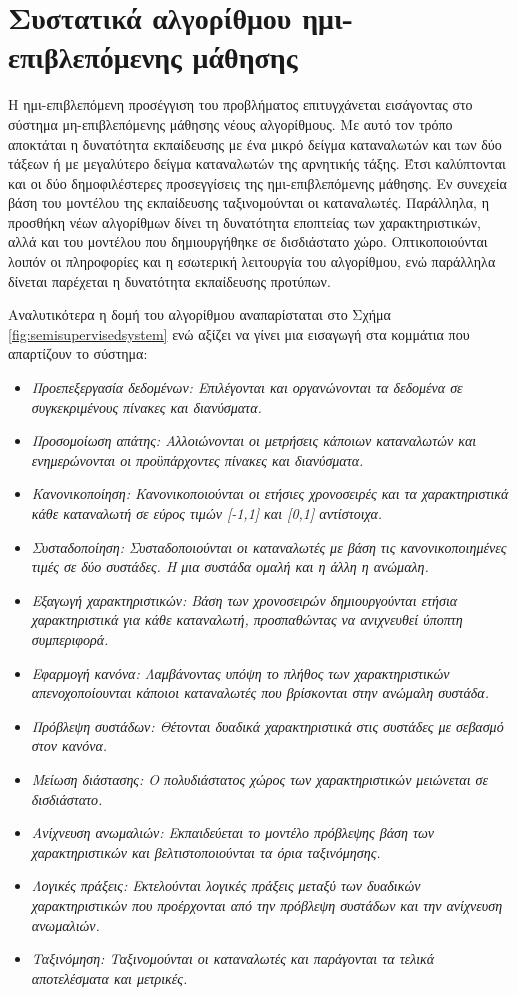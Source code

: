 \section{Συστατικά αλγορίθμου ημι-επιβλεπόμενης μάθησης}
Η ημι-επιβλεπόμενη προσέγγιση του προβλήματος επιτυγχάνεται εισάγοντας στο σύστημα μη-επιβλεπόμενης μάθησης νέους αλγορίθμους. Με αυτό τον τρόπο αποκτάται η δυνατότητα εκπαίδευσης με ένα μικρό δείγμα καταναλωτών και των δύο τάξεων ή με μεγαλύτερο δείγμα καταναλωτών της αρνητικής τάξης. Έτσι καλύπτονται και οι δύο δημοφιλέστερες προσεγγίσεις της ημι-επιβλεπόμενης μάθησης. Εν συνεχεία βάση του μοντέλου της εκπαίδευσης ταξινομούνται οι καταναλωτές. Παράλληλα, η προσθήκη νέων αλγορίθμων δίνει τη δυνατότητα εποπτείας των χαρακτηριστικών, αλλά και του μοντέλου που δημιουργήθηκε σε δισδιάστατο χώρο. Οπτικοποιούνται λοιπόν οι πληροφορίες και η εσωτερική λειτουργία του αλγορίθμου, ενώ παράλληλα δίνεται παρέχεται η δυνατότητα εκπαίδευσης προτύπων.\par
Αναλυτικότερα η δομή του αλγορίθμου αναπαρίσταται στο Σχήμα \ref{fig:semisupervisedsystem} ενώ αξίζει να γίνει μια εισαγωγή στα κομμάτια που απαρτίζουν το σύστημα:
\begin{itemize}
\item \em{Προεπεξεργασία δεδομένων}: Επιλέγονται και οργανώνονται τα δεδομένα σε συγκεκριμένους πίνακες και διανύσματα.
\item \em{Προσομοίωση απάτης}: Αλλοιώνονται οι μετρήσεις κάποιων καταναλωτών και ενημερώνονται οι προϋπάρχοντες πίνακες και διανύσματα.
\item \em{Κανονικοποίηση}: Κανονικοποιούνται οι ετήσιες χρονοσειρές και τα χαρακτηριστικά κάθε καταναλωτή σε εύρος τιμών [-1,1] και [0,1] αντίστοιχα.
\item \em{Συσταδοποίηση}: Συσταδοποιούνται οι καταναλωτές με βάση τις κανονικοποιημένες τιμές σε δύο συστάδες. Η μια συστάδα ομαλή και η άλλη η ανώμαλη. 
\item \em{Εξαγωγή χαρακτηριστικών}: Βάση των χρονοσειρών δημιουργούνται ετήσια χαρακτηριστικά για κάθε καταναλωτή, προσπαθώντας να ανιχνευθεί ύποπτη συμπεριφορά.
\item \em{Εφαρμογή κανόνα}: Λαμβάνοντας υπόψη το πλήθος των χαρακτηριστικών απενοχοποίουνται κάποιοι καταναλωτές που βρίσκονται στην ανώμαλη συστάδα.
\item \em{Πρόβλεψη συστάδων}: Θέτονται δυαδικά χαρακτηριστικά στις συστάδες με σεβασμό στον κανόνα.
\item \em{Μείωση διάστασης}: Ο πολυδιάστατος χώρος των χαρακτηριστικών μειώνεται σε δισδιάστατο.
\item \em{Ανίχνευση ανωμαλιών}: Εκπαιδεύεται το μοντέλο πρόβλεψης βάση των χαρακτηριστικών και βελτιστοποιούνται τα όρια ταξινόμησης.
\item \em{Λογικές πράξεις}: Εκτελούνται λογικές πράξεις μεταξύ των δυαδικών χαρακτηριστικών που προέρχονται από την πρόβλεψη συστάδων και την ανίχνευση ανωμαλιών.
\item \em{Ταξινόμηση}: Ταξινομούνται οι καταναλωτές και παράγονται τα τελικά αποτελέσματα και μετρικές.
\end{itemize}

